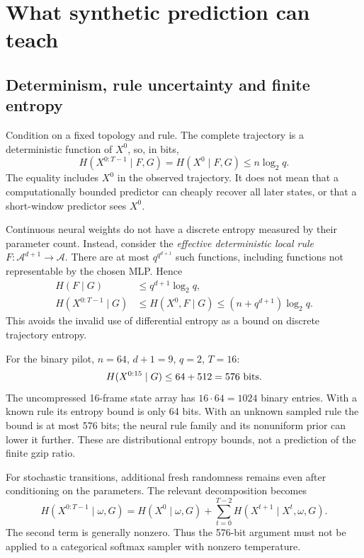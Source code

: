 \section{What synthetic prediction can teach}
\label{sec:information}

\subsection{Determinism, rule uncertainty and finite entropy}

Condition on a fixed topology and rule. The complete trajectory is a
deterministic function of $X^0$, so, in bits,
\begin{equation}
 H(X^{0:T-1}\mid F,G)=H(X^0\mid F,G)
 \leq n\log_2q.
 \label{eq:knownruleentropy}
\end{equation}
The equality includes $X^0$ in the observed trajectory. It does not mean
that a computationally bounded predictor can cheaply recover all later
states, or that a short-window predictor sees $X^0$.

Continuous neural weights do not have a discrete entropy measured by their
parameter count. Instead, consider the \emph{effective deterministic local
rule} $F:\mathcal A^{d+1}\to\mathcal A$.
There are at most $q^{q^{d+1}}$ such functions, including functions not
representable by the chosen MLP. Hence
\begin{align}
 H(F\mid G)&\leq q^{d+1}\log_2q,\\
 H(X^{0:T-1}\mid G)&\leq
     H(X^0,F\mid G)
     \leq(n+q^{d+1})\log_2q.
 \label{eq:unknownruleentropy}
\end{align}
This avoids the invalid use of differential entropy as a bound on
discrete trajectory entropy.

For the binary pilot, $n=64$, $d+1=9$, $q=2$, $T=16$:
\begin{equation}
 H(X^{0:15}\mid G)\leq64+512=576\ {\rm bits}.
\end{equation}
The uncompressed 16-frame state array has $16\cdot64=1024$ binary entries.
With a known rule its entropy bound is only 64 bits. With an unknown
sampled rule the bound is at most 576 bits; the neural rule family and its
nonuniform prior can lower it further. These are distributional entropy
bounds, not a prediction of the finite gzip ratio.

For stochastic transitions, additional fresh randomness remains even
after conditioning on the parameters. The relevant decomposition becomes
\begin{equation}
 H(X^{0:T-1}\mid\omega,G)
 =H(X^0\mid\omega,G)+
   \sum_{t=0}^{T-2}H(X^{t+1}\mid X^t,\omega,G).
 \label{eq:stochasticentropy}
\end{equation}
The second term is generally nonzero. Thus the 576-bit argument must not
be applied to a categorical softmax sampler with nonzero temperature.

